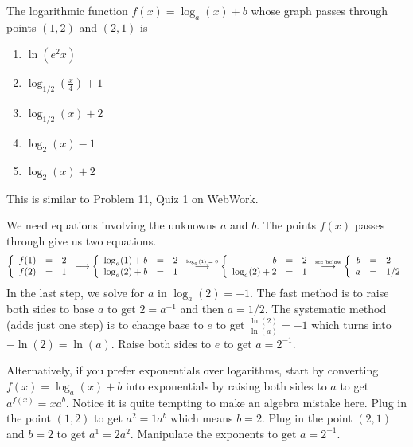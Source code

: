 \documentclass[../main.tex]{subfiles}
\begin{document}
\begin{exercise} \label{ex:midterm-practice-1}
  The logarithmic function \(f(x) = \log_{a}(x) + b\) whose graph passes through points \((1,2)\) and \((2,1)\) is
  \begin{enumerate}[label=\Alph*.]
    \item \(\ln(e^{2}x)\)
    \item \(\log_{1/2}\left(\frac{x}{4}\right) + 1\)
    \item \(\log_{1/2}(x) + 2\)
    \item \(\log_{2}(x) - 1\)
    \item \(\log_{2}(x) + 2\)
  \end{enumerate}
  \begin{hint}
    This is similar to Problem 11, Quiz 1 on WebWork.
  \end{hint}

  \begin{solution}
    We need equations involving the unknowns \(a\) and \(b\). The points \(f(x)\) passes through give us two equations.
    \[
      \left\{
      \begin{array}{rcl}
        f(1) &=& 2\\
        f(2) &=& 1
      \end{array}
      \right.
      \longrightarrow
      \left\{
      \begin{array}{rcl}
        \log_{a}(1) + b &=& 2\\
        \log_{a}(2) + b &=& 1
      \end{array}
      \right.
      \overset{\text{\tiny \(\log_{a}(1) = 0\)}}{\longrightarrow}
      \left\{
      \begin{array}{rcl}
        b &=& 2\\
        \log_{a}(2) + 2 &=& 1
      \end{array}
      \right.
      \overset{\text{\tiny see below}}{\longrightarrow}
      \left\{
      \begin{array}{rcl}
        b &=& 2\\
        a &=& 1/2
      \end{array}
      \right.
    \]
    In the last step, we solve for \(a\) in \(\log_{a}(2) = -1\). The fast method is to raise both sides to base \(a\) to get \(2 = a^{-1}\) and then \(a = 1/2\).  The systematic method (adds just one step) is to change base to \(e\) to get \(\frac{\ln(2)}{\ln(a)} = -1\) which turns into \(-\ln(2) = \ln(a)\). Raise both sides to \(e\) to get \(a = 2^{-1}\).

    Alternatively, if you prefer exponentials over logarithms, start by converting \(f(x) = \log_{a}(x) + b\) into exponentials by raising both sides to \(a\) to get \(a^{f(x)} = x a^{b}\). Notice it is quite tempting to make an algebra mistake here. Plug in the point \((1,2)\) to get \(a^{2} = 1 a^{b}\) which means \(b = 2\). Plug in the point \((2,1)\) and \(b = 2\) to get \(a^{1} = 2 a^{2}\). Manipulate the exponents to get \(a = 2^{-1}\).
  \end{solution}
\end{exercise}
\nopagebreak\vfill
\end{document}
